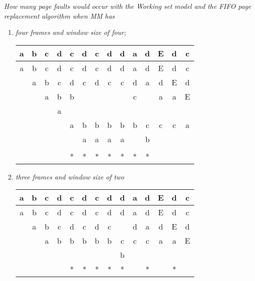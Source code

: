 \documentclass[letterpaper,11pt]{article}
\begin{document}
\begin{enumerate}
\emph{How many page faults would occur with the Working set model and the FIFO page replacement algorithm when MM has}

  \begin{enumerate}
    \item \emph{four frames and window size of four;}

\begin{center}
  \begin{tabular}{ | c | c | c | c | c | c | c | c | c | c | c | c | c | c | }
  \hline
                     a & b & c & d & c & d & c & d & d & a & d & E & d & c \\ \hline 
                     a & b & c & d & c & d & c & d & d & a & d & E & d & c \\
                       & a & b & c & d & c & d & c & c & d & a & d & E & d \\
                       &   & a & b & b &   &   &   &   & c &   & a & a & E \\
                       &   &   & a &   &   &   &   &   &   &   &   &   &   \\ \hline
                       &   &   &   & a & b & b & b & b & b & c & c & c & a \\
                       &   &   &   &   & a & a & a & a &   & b &   &   &   \\
                       &   &   &   &   &   &   &   &   &   &   &   &   &   \\ \hline
                       &   &   &   & * & * & * & * & * & * & * &   &   &   \\ \hline
  \end{tabular}
\end{center}

    \item \emph{three frames and window size of two}

\begin{center}
  \begin{tabular}{ | c | c | c | c | c | c | c | c | c | c | c | c | c | c | }
  \hline
                     a & b & c & d & c & d & c & d & d & a & d & E & d & c \\ \hline 
                     a & b & c & d & c & d & c & d & d & a & d & E & d & c \\
                       & a & b & c & d & c & d & c &   & d & a & d & E & d \\ \hline
                       &   & a & b & b & b & b & b & c & c & c & a & a & E \\
                       &   &   &   &   &   &   &   & b &   &   &   &   &   \\ \hline
                       &   &   &   & * & * & * & * & * &   & * &   & * &   \\ \hline
  \end{tabular}
\end{center}
  \end{enumerate}


\end{enumerate}
\end{document}
